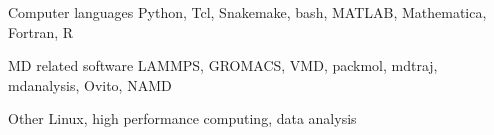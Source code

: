 
\begin{cvskills}
  
  \cvskill
    {Computer languages} %
    {Python, Tcl, Snakemake, bash, MATLAB, Mathematica, Fortran, R} %

  \cvskill
    {MD related software} %
    {LAMMPS, GROMACS, VMD, packmol, mdtraj, mdanalysis, Ovito, NAMD} %
  
  \cvskill
    {Other} %
    {Linux, high performance computing, data analysis} %
    
\end{cvskills}
